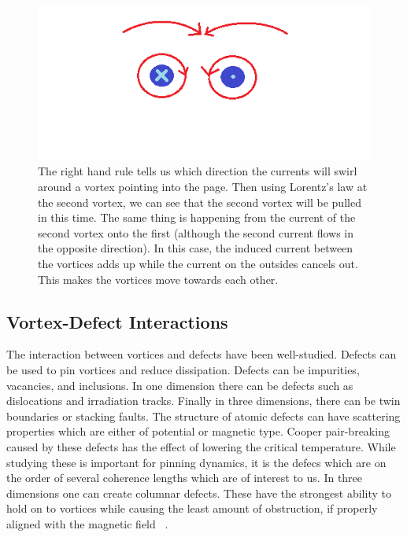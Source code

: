 \begin{figure}[htbp]
\begin{center}
\includegraphics[scale=.50]{oppositeDirection.png}
\caption{The right hand rule tells us which direction the currents will swirl around a vortex pointing into the page. Then using Lorentz's law  at the second vortex, we can see that the second vortex will be pulled in this time. The same thing is happening from the current of the second vortex onto the first (although the second current flows in the opposite direction). In this case, the induced current between the vortices adds up while the current on the outsides cancels out. This makes the vortices move towards each other.}
\label{diffV}
\end{center}
\end{figure}

\subsection{Vortex-Defect Interactions}
The interaction between vortices and defects have been well-studied. Defects can be used to pin vortices and reduce dissipation. Defects can be impurities, vacancies, and inclusions. In one dimension there can be defects such as dislocations and irradiation tracks. Finally in three dimensions, there can be twin boundaries or stacking faults. The structure of atomic defects can have scattering properties which are either of potential or magnetic type. Cooper pair-breaking caused by these defects has the effect of lowering the critical temperature. While studying these is important for pinning dynamics, it is the defecs which are on the order of several coherence lengths which are of interest to us. In three dimensions one can create columnar defects. These have the strongest ability to hold on to vortices while causing the least amount of obstruction, if properly aligned with the magnetic field ~\cite{Kwok16}.

